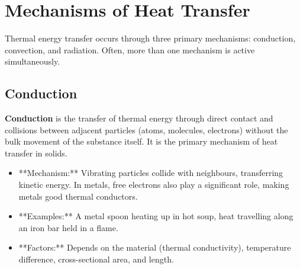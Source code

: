 
\FloatBarrier

\section{Mechanisms of Heat Transfer}
\label{sec:heat_transfer_mechanisms}
\FloatBarrier

Thermal energy transfer occurs through three primary mechanisms: conduction, convection, and radiation. Often, more than one mechanism is active simultaneously.


\subsection{Conduction}
\FloatBarrier %

\textbf{Conduction} is the transfer of thermal energy through direct contact and collisions between adjacent particles (atoms, molecules, electrons) without the bulk movement of the substance itself. It is the primary mechanism of heat transfer in solids.
\begin{itemize}
    \item **Mechanism:** Vibrating particles collide with neighbours, transferring kinetic energy. In metals, free electrons also play a significant role, making metals good thermal conductors.
    \item **Examples:** A metal spoon heating up in hot soup, heat travelling along an iron bar held in a flame.
    \item **Factors:** Depends on the material (thermal conductivity), temperature difference, cross-sectional area, and length.
\end{itemize}

